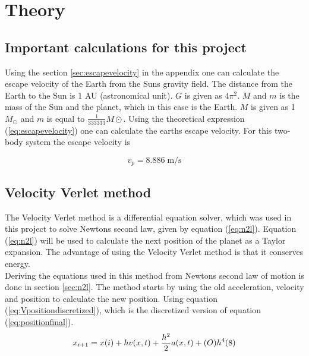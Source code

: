 \documentclass{article}
\begin{document}
\vspace{1cm}

\section{Theory} \label{sec:Theory}

\subsection{Important calculations for this project}

    Using the section \ref{sec:escapevelocity} in the appendix one can calculate the escape velocity of the Earth from the Suns gravity field. The distance from the Earth to the Sun is 1 AU (astronomical unit). $G$ is given as $4 \pi^{2}$. $M$ and $m$ is the mass of the Sun and the planet, which in this case is the Earth. $M$ is given as 1 $M_{\odot}$ and $m$ is equal to $\frac{1}{333333} M\odot$. Using the theoretical expression (\ref{eq:escapevelocity}) one can calculate the earths escape velocity. For this two-body system the escape velocity is

    \begin{equation}    \label{eq:theoretical escapevelocity}
        v_p = 8.886 \; \textrm{m/s}
    \end{equation}

\subsection{Velocity Verlet method}

    The Velocity Verlet method is a differential equation solver, which was used in this project to solve Newtons second law, given by equation (\ref{eq:n2l}). Equation (\ref{eq:n2l}) will be used to calculate the next position of the planet as a Taylor expansion. The advantage of using the Velocity Verlet method is that it conserves energy. \\

    Deriving the equations used in this method from Newtons second law of motion is done in section \ref{sec:n2l}. The method starts by using the old acceleration, velocity and position to calculate the new position. Using equation (\ref{eq:Vpositiondiscretized}), which is the discretized version of equation (\ref{eq:positionfinal}). \\

    \begin{equation}    \label{eq:Vpositiondiscretized}
        x_{i+1} = x(i) + h v(x,t) + \frac{h^{2}}{2} a(x,t) + (O)h^{4} (8)\\
    \end{equation}
\end{document}
